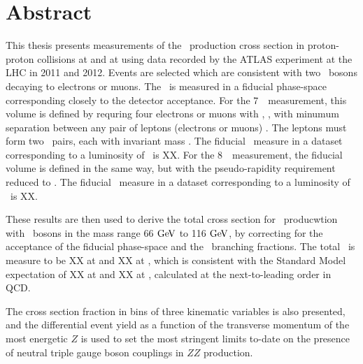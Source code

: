 \chapter*{Abstract}
This thesis presents measurements of the \ZZ\ production cross section in proton-proton collisions
at  and at  using data recorded by the ATLAS experiment 
at the LHC in 2011 and 2012.  
Events are selected which are consistent with two \Z\ bosons decaying to
electrons or muons. The \cx\ is measured in a fiducial phase-space corresponding
closely to the detector acceptance. For the 7~\tev\ measurement, this volume is
defined by requring four electrons or muons with , ,
with minumum separation between any pair of leptons (electrons or muons) . The leptons
must form two \ossf\ pairs, each with invariant mass \sstooos. The fiducial \cx\
measure in a dataset corresponding to a luminosity of
\LumiPassGRLTwentyEleven\ifb\ is XX. For the 8~\tev\ measurement, the fiducial
volume is defined in the same way, but with the pseudo-rapidity requirement
reduced to \modetalt{2.7}. The fiducial \cx\
measure in a dataset corresponding to a luminosity of
\LumiPassGRLTwentyTwelve\ifb\ is XX.

These results are then used to derive the total cross section for \ZZ\
producwtion with \Z\ bosons in the mass range 66$\GeV$ to 116$\GeV$, by
correcting for the acceptance of the fiducial phase-space and the \Zll\
branching fractions. The total \cx\ is measure to be XX at  and XX at
\sqrtseq{8}, which is consistent with the Standard Model
expectation of XX at \sqrtseq{7} and XX at
\sqrtseq{8}, calculated at the next-to-leading order in QCD.

The cross section fraction in bins of three kinematic variables is also presented, and 
the differential event yield as a function of the transverse momentum of the most energetic $Z$ 
is used to set the most stringent limits to-date on the presence of 
neutral triple gauge boson couplings in $ZZ$ production.
